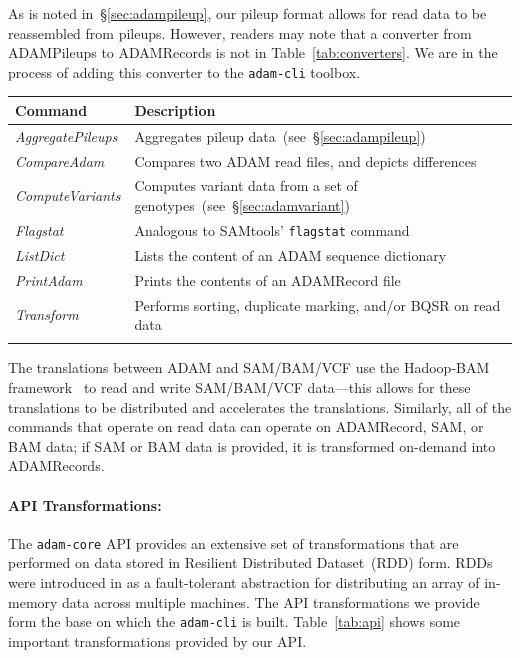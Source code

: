 \documentclass{bioinfo}
\begin{document}
As is noted in~\S\ref{sec:adampileup}, our pileup format allows for read data to be reassembled from pileups. However, readers may note that a converter from ADAMPileups
to ADAMRecords is not in Table~\ref{tab:converters}. We are in the process of adding this converter to the \texttt{adam-cli} toolbox.

\begin{table}[h]
{\begin{tabular}{ l p{6cm} }
\toprule
\bf Command & \bf Description \\
\midrule
\textit{AggregatePileups} & Aggregates pileup data~(see~\S\ref{sec:adampileup}) \\
\textit{CompareAdam} & Compares two ADAM read files, and depicts differences \\
\textit{ComputeVariants} & Computes variant data from a set of genotypes~(see~\S\ref{sec:adamvariant}) \\
\textit{Flagstat} & Analogous to SAMtools' \texttt{flagstat} command \\
\textit{ListDict} & Lists the content of an ADAM sequence dictionary \\
\textit{PrintAdam} & Prints the contents of an ADAMRecord file \\
\textit{Transform} & Performs sorting, duplicate marking, and/or BQSR on read data \\
\botrule
\end{tabular}}{}
\end{table}

The translations between ADAM and SAM/BAM/VCF use the Hadoop-BAM framework~\citep[see][]{niemenmaa12} to read and write SAM/BAM/VCF data---this allows for these
translations to be distributed and accelerates the translations. Similarly, all of the commands that operate on read data can operate on ADAMRecord, SAM, or BAM data;
if SAM or BAM data is provided, it is transformed on-demand into ADAMRecords.

\paragraph{API Transformations:}
\label{sec:api-transforms}

The \texttt{adam-core} API provides an extensive set of transformations that are performed on data stored in Resilient Distributed Dataset~(RDD) form. RDDs were introduced
in \citet{zaharia12} as a fault-tolerant abstraction for distributing an array of in-memory data across multiple machines. The API transformations we provide form the base on
which the \texttt{adam-cli} is built. Table~\ref{tab:api} shows some important transformations provided by our API.
\end{document}
